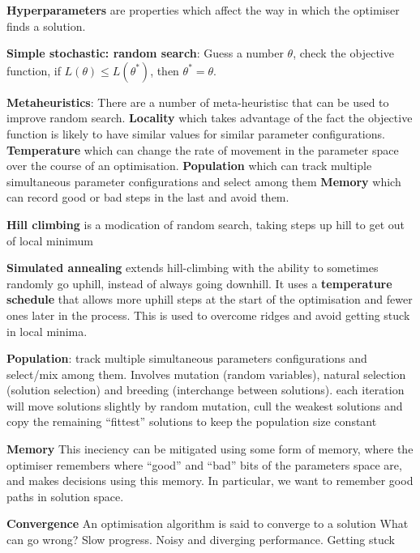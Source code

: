\documentclass{article}
\begin{document}
\noindent \textbf{Hyperparameters} are properties which affect the way in which the optimiser finds a solution.

\noindent \textbf{Simple stochastic: random search}: Guess a number $\theta$, check the objective function,
if $L(\theta) \le L(\theta^*)$, then $\theta^* = \theta$.

\noindent \textbf{Metaheuristics}:
There are a number of meta-heuristisc that can be used to improve random search.
\textbf{Locality} which takes advantage of the fact the objective function is likely to have similar values for similar parameter configurations.
\textbf{Temperature} which can change the rate of movement in the parameter space over the course of an optimisation.
\textbf{Population} which can track multiple simultaneous parameter configurations and select among them
\textbf{Memory} which can record good or bad steps in the last and avoid them.

\noindent \textbf{Hill climbing} is a modication of random search, taking steps up hill to get out of local minimum

\noindent \textbf{Simulated annealing} extends hill-climbing with the ability to sometimes randomly go
uphill, instead of always going downhill. It uses a \textbf{temperature schedule} that allows more
uphill steps at the start of the optimisation and fewer ones later in the process. This is used
to overcome ridges and avoid getting stuck in local minima.

\noindent \textbf{Population}: track multiple simultaneous parameters configurations and select/mix among them.
Involves mutation (random variables), natural selection (solution selection) and breeding (interchange between solutions).
each iteration will move solutions slightly by random mutation, cull the weakest solutions and copy the remaining “fittest” solutions to keep the population size constant

\noindent \textbf{Memory} This ineciency can be mitigated
using some form of memory, where the optimiser remembers where “good” and “bad” bits
of the parameters space are, and makes decisions using this memory. In particular, we want
to remember good paths in solution space.

\noindent \textbf{Convergence}
An optimisation algorithm is said to converge to a solution
What can go wrong? Slow progress. Noisy and diverging performance. Getting stuck
\end{document}
